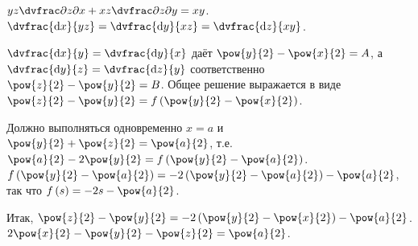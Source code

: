 \documentclass[a5paper,10pt]{article}
\begin{document}
    $yz \vparder{z}{x} + xz \vparder{z}{y} = xy$.
    $\dvfrac {\di x} {yz}
    = \dvfrac {\di y} {xz}
    = \dvfrac {\di z} {xy}$.

    $\dvfrac {\di x} {y} = \dvfrac {\di y} {x}$ даёт
    $\pow{y}{2} - \pow{x}{2} = A$, а 
    $\dvfrac {\di y} {z} = \dvfrac {\di z} {y}$
    соответственно
    $\pow{z}{2} - \pow{y}{2} = B$.
    Общее решение выражается в виде
    $\pow{z}{2} - \pow{y}{2} = f\br{\pow{y}{2} - \pow{x}{2}}$.

    Должно выполняться одновременно
    $x = a$ и $\pow{y}{2} + \pow{z}{2} = \pow{a}{2}$, т.е. 
    $\pow{a}{2} - 2\pow{y}{2} = f\br{\pow{y}{2} - \pow{a}{2}}$.
    $f\br{\pow{y}{2} - \pow{a}{2}} = -2\br{\pow{y}{2} - \pow{a}{2}} - \pow{a}{2}$, так что
    $f\br{s} = -2s - \pow{a}{2}$.

    Итак, $\pow{z}{2} - \pow{y}{2} = -2\br{\pow{y}{2} - \pow{x}{2}} - \pow{a}{2}$.
    $2\pow{x}{2} - \pow{y}{2} - \pow{z}{2} = \pow{a}{2}$.
\end{document}
